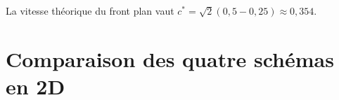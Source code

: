 \documentclass[11pt,a4paper]{report}
\begin{document}
La vitesse th\'eorique du front plan vaut $c^*=\sqrt{2}(0{,}5-0{,}25)\approx 0{,}354$.

\section{Comparaison des quatre sch\'emas en 2D}
\end{document}
